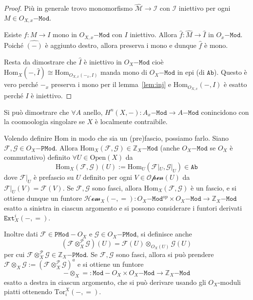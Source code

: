 \begin{proof}{}
Più in generale trovo monomorfismo \(\widehat{\mathcal{M}} \to \mathcal{I}\)
    con \(\mathcal{I}\) iniettivo per ogni \(M \in O_{X, x}\mathtt{-Mod}\).

    Esiste \(f : M \to I\) mono in \(O_{X, x} \mathtt{-Mod}\) con \(I\)
    iniettivo. Allora \(\widehat{f} : \widehat{M} \to \widehat{I}\) in
    \(O_x\mathtt{-Mod}\). Poiché \(\widehat{{(-)}}\) è aggiunto destro, allora
    preserva i mono e dunque \(\widehat{f}\) è mono.

    Resta da dimostrare che \(\widehat{I}\) è iniettivo in \(O_X\mathtt{-Mod}\)
    cioè \(\mathrm{Hom}_X{(-, \widehat{I})} \cong\mathrm{Hom}_{O_{X,x} {(-_x,
    I)}} \) manda mono di \(O_X\mathtt{-Mod}\) in epi (di \(\mathtt{Ab}\)).
    Questo è vero perché \(-_x\) preserva i mono per il lemma~\ref{lem:inj} e
    \(\mathrm{Hom}_{O_{X,x} } {(-, I)}\) è esatto perché \(I\) è iniettivo.
    
\end{proof}

\begin{example}{}
    Si può dimostrare che \(\forall A\) anello, \(H^{n}{(X, -)} :
    A_x\mathtt{-Mod} \to A\mathtt{-Mod}\) conincidono con la coomoologia
    singolare se \(X\) è localmente contraibile.
\end{example}

Volendo definire \(\mathrm{Hom}\) in modo che sia un (pre)fascio, possiamo
farlo. Siano \(\mathcal{F}, \mathcal{G} \in O_X\mathtt{-PMod}\). Allora
\(\mathrm{Hom}_X{(\mathcal{F}, \mathcal{G})} \in \mathbb{Z}_X\mathtt{-Mod}\)
(anche \(O_X\mathtt{-Mod}\) se \(O_X\) è commutativo) definito \(\forall U \in
\mathrm{Open}{(X)}\) da 
\[
  \mathrm{Hom}_X{(\mathcal{F}, \mathcal{G})}{(U)} :=
  \mathrm{Hom}_U{(\mathcal{F}|_U, \mathcal{G}|_U)} \in \mathtt{Ab}
\]
dove \(\mathcal{F}|_U\) è prefascio su \(U\) definito per ogni \(V \in
\mathcal{Open}{(U)}\) da \(\mathcal{F}|_U{(V)} = \mathcal{F}{(V)}\). 
Se \(\mathcal{F}, \mathcal{G}\) sono fasci, allora
\(\mathrm{Hom}_X{(\mathcal{F}, \mathcal{G})}\) è un fascio, e si ottiene
dunque un funtore \(\mathcal{Hom}_X{(-, =)} : O_X\mathtt{-Mod}^{op} \times
O_X\mathtt{-Mod} \to \mathbb{Z}_X\mathtt{-Mod}\) esatto a sinistra in ciascun
argomento e si possono considerare i funtori derivati \(\mathtt{Ext}_X^{i}{(-,
=)}\).

Inoltre dati \(\mathcal{F} \in \mathtt{PMod-}O_X\) e \(\mathcal{G} \in
O_X\mathtt{-PMod}\), si definisce anche 
\[
{(\mathcal{F} \otimes_X^{\mathcal{P}} \mathcal{G})} {(U)} = \mathcal{F}{(U)}
  \otimes_{O_X{(U)}} \mathcal{G}{(U)}
\]
per cui \(\mathcal{F} \otimes_X^{\mathcal{P}} \mathcal{G} \in
\mathbb{Z}_X\mathtt{-PMod}\). Se \(\mathcal{F}, \mathcal{G}\) sono fasci, allora
si può prendere \(\mathcal{F} \otimes_X \mathcal{G} := {\left( \mathcal{F}
\otimes_X^{\mathcal{P}} \mathcal{G}\right)}^{a}\) e si ottiene un funtore 
\[
  - \otimes_X = : \mathtt{Mod-}O_X \times O_X\mathtt{-Mod} \to
  \mathbb{Z}_X\mathtt{-Mod}
\]
esatto a destra in ciascun argomento, che si può derivare usando gli
\(O_X\)-moduli piatti ottenendo \(\mathrm{Tor}_i^{X}{(-, =)}\).

